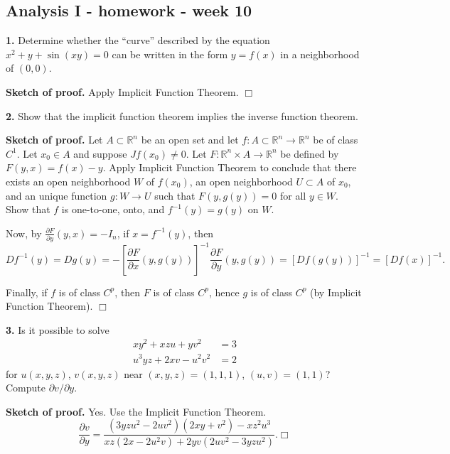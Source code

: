 \documentclass{article}
\begin{document}
    
    
    
    
    

    
    \subsection*{Analysis I - homework - week
10}\label{analysis-i---homework---week-10}

    \textbf{1.} Determine whether the ``curve'' described by the equation
$x^2 + y + \sin(xy) = 0$ can be written in the form $y = f (x)$ in a
neighborhood of $(0, 0)$.

    \textbf{Sketch of proof.} Apply Implicit Function Theorem. $\Box$

    \textbf{2.} Show that the implicit function theorem implies the inverse
function theorem.

    \textbf{Sketch of proof.} Let $A \subset \mathbb{R}^n$ be an open set
and let $f: A\subset \mathbb{R}^n \to \mathbb{R}^n$ be of class $C^1$.
Let $x_0\in A$ and suppose $Jf(x_0) \ne 0$. Let
$F: \mathbb{R}^n \times A \to \mathbb{R}^n$ be defined by
$F(y,x) = f(x) - y$. Apply Implicit Function Theorem to conclude that
there exists an open neighborhood $W$ of $f(x_0)$, an open neighborhood
$U\subset A$ of $x_0$, and an unique function $g:W \to U$ such that
$F(y,g(y)) = 0$ for all $y \in W$. Show that $f$ is one-to-one, onto,
and $f^{-1}(y) = g(y)$ on $W$.

Now, by $\frac{\partial F}{\partial y}(y,x) = -I_n$, if $x=f^{-1}(y)$,
then
\[Df^{-1}(y) = Dg(y) = -\left[\frac{\partial F}{\partial x}(y,g(y))\right]^{-1} \frac{\partial F}{\partial y}(y,g(y)) = [Df(g(y))]^{-1} = [Df(x)]^{-1}.\]

Finally, if $f$ is of class $C^{p}$, then $F$ is of class $C^p$, hence
$g$ is of class $C^{p}$ (by Implicit Function Theorem). $\Box$

    \textbf{3.} Is it possible to solve \[\begin{aligned}
xy^2 + xzu + yv^2 &= 3 \\
u^3yz + 2xv − u^2 v^2 &= 2
\end{aligned}\] for $u(x,y,z)$, $v(x,y,z)$ near $(x,y,z) = (1,1,1)$,
$(u,v) = (1,1)$? Compute $\partial v/\partial y$.

    \textbf{Sketch of proof.} Yes. Use the Implicit Function Theorem.
\[\frac{\partial v}{\partial y} = \frac{(3yzu^2 - 2uv^2)(2xy + v^2) - xz^2u^3}{xz(2x - 2u^2v) + 2yv(2uv^2 - 3yzu^2)}. \Box\]
\end{document}
